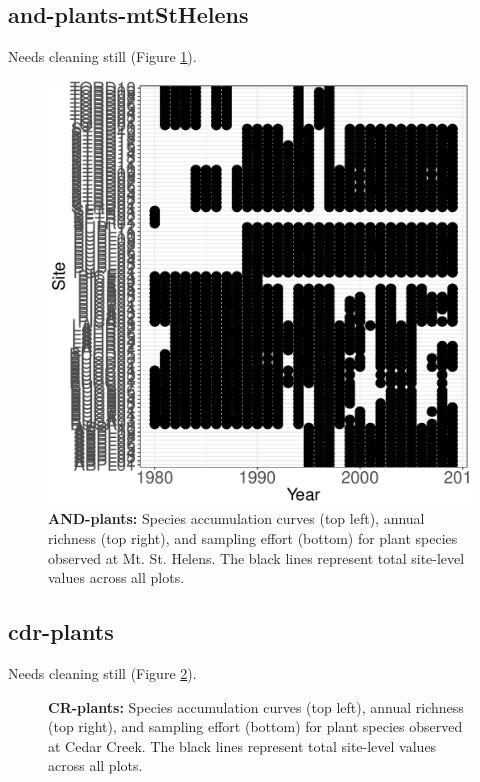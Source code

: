 \documentclass[11pt, oneside]{article}
\begin{document}
\subsection {and-plants-mtStHelens}
Needs cleaning still (Figure \ref{and-plants}).

\begin{figure}[h!]
\centering
\includegraphics[scale = 0.4]{and-plants-mtStHelens_spatiotemporal_sampling_effort.pdf}
\caption{{\bf AND-plants:} Species accumulation curves (top left),  annual richness (top right), and sampling effort (bottom)  for plant species observed at Mt. St. Helens. The black lines represent total site-level values across all plots.}
\label{and-plants}
\end{figure}


\subsection {cdr-plants}
Needs cleaning still (Figure \ref{cdr-plants}).

\begin{figure}[h!]
\centering
\caption{{\bf CR-plants:} Species accumulation curves (top left),  annual richness (top right), and sampling effort (bottom)  for plant species observed at Cedar Creek. The black lines represent total site-level values across all plots.}
\label{cdr-plants}
\end{figure}
\end{document}
